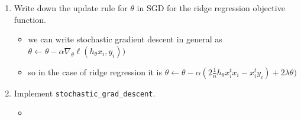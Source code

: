 \documentclass{article}
\begin{document}
\begin{enumerate}
\item Write down the update rule for $\theta$ in SGD for the ridge
regression objective function.
\begin{itemize}
    \item we can write stochastic gradient descent in general as $\theta\leftarrow \theta - \alpha \nabla_{\theta}\ell(h_{\theta}x_i,y_i))$
    \item so in the case of ridge regression it is   $\theta\leftarrow \theta - \alpha(2\frac{1}{n}h_{\theta} x_i^{t}x_i-x_i^{t}y_i)+2\lambda \theta)$
\end{itemize}

\item Implement \texttt{stochastic\_grad\_descent}. 
\begin{itemize}
    \item \inputminted[firstline=235, lastline=274, breaklines=True]{python}{HW_2.PY.py}
\end{itemize}




\end{enumerate}
\end{document}
